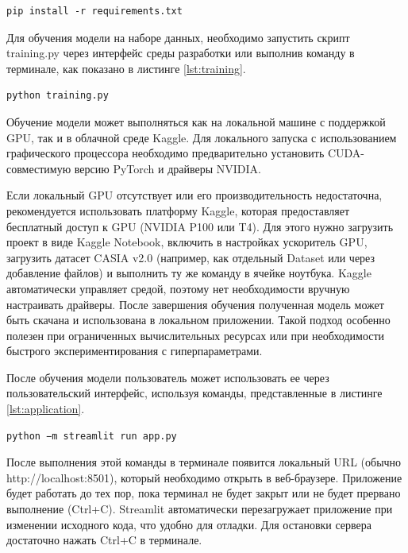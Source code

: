 \begin{lstlisting}[caption=Листинг 3.1 -- Установка всех необходимых библиотек,label=lst:library]
pip install -r requirements.txt
\end{lstlisting}

Для обучения модели на наборе данных, необходимо запустить скрипт training.py через интерфейс среды разработки или выполнив команду в терминале, как показано в листинге \ref{lst:training}.

\begin{lstlisting}[caption=Листинг 3.2 -- Команда для запуска обучения модели,label=lst:training]
python training.py
\end{lstlisting}

Обучение модели может выполняться как на локальной машине с поддержкой GPU, так и в облачной среде Kaggle. Для локального запуска с использованием графического процессора необходимо предварительно установить CUDA-совместимую версию PyTorch и драйверы NVIDIA. 

Если локальный GPU отсутствует или его производительность недостаточна, рекомендуется использовать платформу Kaggle, которая предоставляет бесплатный доступ к GPU (NVIDIA P100 или T4). Для этого нужно загрузить проект в виде Kaggle Notebook, включить в настройках ускоритель GPU, загрузить датасет CASIA v2.0 (например, как отдельный Dataset или через добавление файлов) и выполнить ту же команду в ячейке ноутбука. Kaggle автоматически управляет средой, поэтому нет необходимости вручную настраивать драйверы. После завершения обучения полученная модель может быть скачана и использована в локальном приложении. Такой подход особенно полезен при ограниченных вычислительных ресурсах или при необходимости быстрого экспериментирования с гиперпараметрами.

После обучения модели пользователь может использовать ее через пользовательский интерфейс, используя команды, представленные в листинге \ref{lst:application}.

\begin{lstlisting}[caption=Листинг 3.3 -- Команда для запуска приложения,label=lst:application]
python −m streamlit run app.py
\end{lstlisting}

После выполнения этой команды в терминале появится локальный URL (обычно http://localhost:8501), который необходимо открыть в веб-браузере. Приложение будет работать до тех пор, пока терминал не будет закрыт или не будет прервано выполнение (Ctrl+C). Streamlit автоматически перезагружает приложение при изменении исходного кода, что удобно для отладки. Для остановки сервера достаточно нажать Ctrl+C в терминале.

